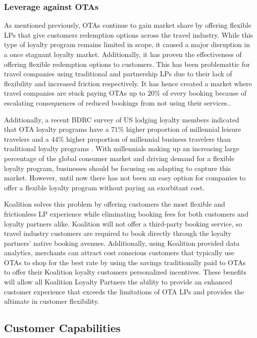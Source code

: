 \subsubsection{Leverage against OTAs}
As mentioned previously, OTAs continue to gain market share by offering flexible LPs that give customers redemption options across the travel industry.  While this type of loyalty program remains limited in scope, it caused a major disruption in a once stagnant loyalty market. Additionally, it has proven the effectiveness of offering flexible redemption options to customers. This has been problemattic for travel companies using traditional and partnership LPs due to their lack of flexibility and increased friction respectively. It has hence created a market where travel companies are stuck paying OTAs up to $20\%$ of every booking because of escalating consequences of reduced bookings from not using their services.. 

Additionally, a recent BDRC survey of US lodging loyalty members indicated that OTA loyalty programs have a $71\%$ higher proportion of millennial leisure travelers and a $44\%$ higher proportion of millennial business travelers than traditional loyalty programs \cite{}.  With millennials making up an increasing large percentage of the global consumer market and driving demand for a flexible loyalty program, businesses should be focusing on adapting to capture this market.  However, until now there has not been an easy option for companies to offer a flexible loyalty program without paying an exorbitant cost.

Koalition solves this problem by offering customers the most flexible and frictionless LP experience while eliminating booking fees for both customers and loyalty partners alike. Koalition will not offer a third-party booking service, so travel industry customers are required to book directly through the loyalty partners' native booking avenues.  Additionally, using Koalition provided data analytics, merchants can attract cost conscious customers that typically use OTAs to shop for the best rate by using the savings traditionally paid to OTAs to offer their Koalition loyalty customers personalized incentives.  These benefits will allow all Koalition Loyalty Partners the ability to provide an enhanced customer experience that exceeds the limitations of OTA LPs and provides the ultimate in customer flexibility.

\subsection{Customer Capabilities}

